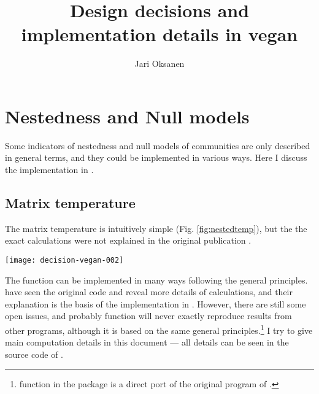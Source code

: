 \documentclass[article,nojss]{jss}
\author{Jari Oksanen}
\title{Design decisions and implementation details in vegan}
\renewcommand{\cite}{\citep}
\begin{document}

\tableofcontents


\section{Nestedness and Null models}

Some indicators of nestedness and null models of communities are only
described in general terms, and they could be implemented in various
ways. Here I discuss the implementation in .

\subsection{Matrix temperature}

The matrix temperature is intuitively simple
(Fig. \ref{fig:nestedtemp}), but the the exact calculations were not
explained in the original publication \cite{AtmarPat93}.
\begin{SCfigure}
\texttt{[image: decision-vegan-002]}
\label{fig:nestedtemp}
\caption{Matrix temperature for \emph{Falco subbuteo} on Sibbo
  Svartholmen (dot). The curve is the fill line, and in a cold
  matrix, all presences (red squares) should be in the upper left
  corner behind the fill line. Dashed diagonal line of length $D$ goes
  through the point, and an arrow of length $d$ connects the point to
  the fill line. The ``surprise'' for this point is $u = (d/D)^2$ and
  the matrix temperature is based on the sum of surprises: presences
  outside the fill line or absences within the fill line.}
\end{SCfigure}
The function can be implemented in many ways following the general
principles.  \citet{RodGir06} have seen the original code and reveal
more details of calculations, and their explanation is the basis of
the implementation in .  However, there are still some open
issues, and probably  function  will never
exactly reproduce results from other programs, although it is based on
the same general principles.\footnote{function  in
  the  package is a direct port of the original
   program of \citet{RodGir06}.}  I try to give
main computation details in this document --- all details can be seen
in the source code of .
\end{document}
